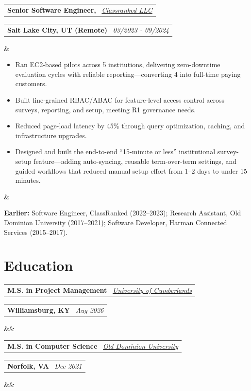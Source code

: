 \documentclass[12pt,a4paper,sans]{moderncv}
\makeatletter
\newcommand*{\customcventry}[7][.13em]{
\begin{tabular}{@{}l}
{\bfseries #4} \
{\itshape #3}
\end{tabular}
\hfill
\begin{tabular}{l@{}}
{\bfseries #5} \
{\itshape #2}
\end{tabular}
\ifx&#7&%
\else{\
\begin{minipage}{\maincolumnwidth}%
\small#7%
\end{minipage}}\fi%
\par\addvspace{#1}}
\makeatother
\begin{document}
\customcventry{03/2023 ‐ 09/2024}{\href{https://classranked.com/}{Classranked LLC}}{Senior Software Engineer,}{Salt Lake City, UT (Remote)}{}{
\setlist{nolistsep}
\begin{itemize}[leftmargin=0.6cm, label={\textbullet}]
\item Ran EC2-based pilots across 5 institutions, delivering zero-downtime evaluation cycles with reliable reporting—converting 4 into full-time paying customers.
\item Built fine-grained RBAC/ABAC for feature-level access control across surveys, reporting, and setup, meeting R1 governance needs.
\item Reduced page-load latency by 45\% through query optimization, caching, and infrastructure upgrades.
\item Designed and built the end-to-end “15-minute or less” institutional survey-setup feature—adding auto-syncing, reusable term-over-term settings, and guided workflows that reduced manual setup effort from 1–2 days to under 15 minutes.
\end{itemize}}

\textbf{Earlier:} Software Engineer, ClassRanked (2022--2023); Research Assistant, Old Dominion University (2017--2021); Software Developer, Harman Connected Services (2015--2017).

\section{Education}
\customcventry{Aug 2026}{\href{https://www.ucumberlands.edu/academics/executive/masters-project-management}{University of Cumberlands}}{M.S. in Project Management}{Williamsburg, KY}{}{}
\customcventry{Dec 2021}{\href{https://www.odu.edu/computer-science}{Old Dominion University}}{M.S. in Computer Science}{Norfolk, VA}{}{}
\end{document}
